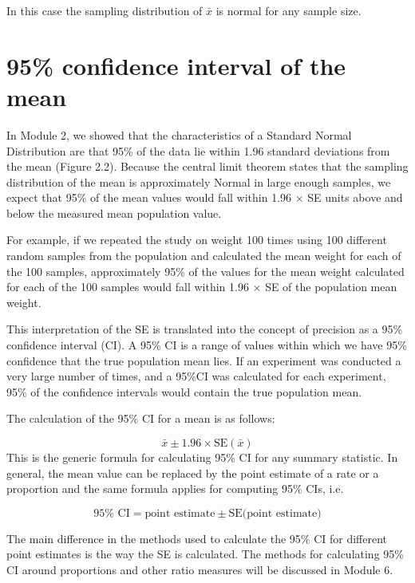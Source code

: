 \documentclass[
]{memoir}
\begin{document}
In this case the sampling distribution of \(\bar{x}\) is normal for any sample size.

\hypertarget{confidence-interval-of-the-mean}{%
\section{95\% confidence interval of the mean}\label{confidence-interval-of-the-mean}}

In Module 2, we showed that the characteristics of a Standard Normal Distribution are that 95\% of the data lie within 1.96 standard deviations from the mean (Figure 2.2). Because the central limit theorem states that the sampling distribution of the mean is approximately Normal in large enough samples, we expect that 95\% of the mean values would fall within 1.96 × SE units above and below the measured mean population value.

For example, if we repeated the study on weight 100 times using 100 different random samples from the population and calculated the mean weight for each of the 100 samples, approximately 95\% of the values for the mean weight calculated for each of the 100 samples would fall within 1.96 × SE of the population mean weight.

This interpretation of the SE is translated into the concept of precision as a 95\% confidence interval (CI). A 95\% CI is a range of values within which we have 95\% confidence that the true population mean lies. If an experiment was conducted a very large number of times, and a 95\%CI was calculated for each experiment, 95\% of the confidence intervals would contain the true population mean.

The calculation of the 95\% CI for a mean is as follows:

\[  \bar{x} \pm 1.96 \times \text{SE}( \bar{x} ) \]
This is the generic formula for calculating 95\% CI for any summary statistic. In general, the mean value can be replaced by the point estimate of a rate or a proportion and the same formula applies for computing 95\% CIs, i.e.

\[ 95\% \text{ CI} = \text{point estimate} \pm \text{SE}(\text{point estimate)} \]

The main difference in the methods used to calculate the 95\% CI for different point estimates is the way the SE is calculated. The methods for calculating 95\% CI around proportions and other ratio measures will be discussed in Module 6.
\end{document}
